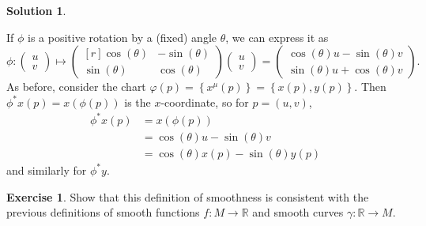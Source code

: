 \documentclass[11pt, a4paper]{article}
\theoremstyle{definition}
\newtheorem{ex}{Exercise}[part]
\newtheorem{sol}{Solution}[part]
\begin{document}
\begin{sol}\label{sol:pullbackrotation}

If $\phi$ is a positive rotation by a (fixed) angle $\theta$, we can express it as
\[
    \phi: \begin{pmatrix}
            u \\ v
        \end{pmatrix}
        \mapsto
        \begin{pmatrix*}[r]
            \cos(\theta) & -\sin(\theta) \\
            \sin(\theta) & \cos(\theta)
        \end{pmatrix*}
        \begin{pmatrix}
            u \\ v
        \end{pmatrix}
        =
        \begin{pmatrix}
            \cos(\theta) u - \sin(\theta) v \\
            \sin(\theta) u + \cos(\theta) v
        \end{pmatrix}.
\]
As before, consider the chart $\varphi(p) = \left\{x^\mu(p)\right\} = \left\{x(p), y(p)\right\}$.
Then $\phi^* x(p) = x(\phi(p))$ is the $x$-coordinate, so for $p = (u, v)$,
\begin{align*}
    \phi^* x(p) &= x(\phi(p)) \\
                &= \cos(\theta) u - \sin(\theta) v \\
                &= \cos(\theta) x(p) - \sin(\theta) y(p)
\end{align*}
and similarly for $\phi^* y$.

\end{sol}

\begin{ex}

Show that this definition of smoothness is consistent with the previous definitions of smooth functions $f: M \to \mathbb{R}$ and smooth curves $\gamma: \mathbb{R} \to M$.

\end{ex}
\end{document}
